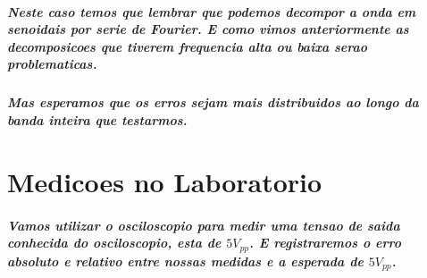 \documentclass[12pt,twoside, a4paper, twocolumn]{article}
\begin{document}
\subparagraph*{Neste caso temos que lembrar que podemos decompor a onda em senoidais por serie de Fourier. E como vimos anteriormente as decomposicoes que tiverem frequencia alta ou baixa serao problematicas.}

\subparagraph*{Mas esperamos que os erros sejam mais distribuidos ao longo da banda inteira que testarmos.}

\section{Medicoes no Laboratorio}

\subparagraph*{Vamos utilizar o osciloscopio para medir uma tensao de saida  conhecida do osciloscopio, esta de $5 V_{pp}$. E registraremos o erro absoluto e relativo entre nossas medidas e a esperada de  $5 V_{pp}$.}
\end{document}
